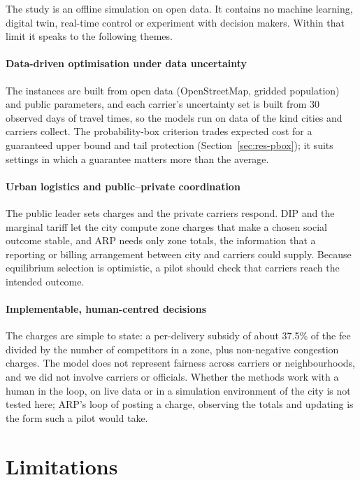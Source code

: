 \documentclass[preprint,12pt]{elsarticle}
\theoremstyle{definition}
\theoremstyle{remark}
\begin{document}
The study is an offline simulation on open data. It contains no machine learning, digital twin, real-time control or experiment with decision makers. Within that limit it speaks to the following themes.

\paragraph{Data-driven optimisation under data uncertainty} The instances are built from open data (OpenStreetMap, gridded population) and public parameters, and each carrier's uncertainty set is built from 30 observed days of travel times, so the models run on data of the kind cities and carriers collect. The probability-box criterion trades expected cost for a guaranteed upper bound and tail protection (Section~\ref{sec:res-pbox}); it suits settings in which a guarantee matters more than the average.

\paragraph{Urban logistics and public--private coordination} The public leader sets charges and the private carriers respond. DIP and the marginal tariff let the city compute zone charges that make a chosen social outcome stable, and ARP needs only zone totals, the information that a reporting or billing arrangement between city and carriers could supply. Because equilibrium selection is optimistic, a pilot should check that carriers reach the intended outcome.

\paragraph{Implementable, human-centred decisions} The charges are simple to state: a per-delivery subsidy of about 37.5\% of the fee divided by the number of competitors in a zone, plus non-negative congestion charges. The model does not represent fairness across carriers or neighbourhoods, and we did not involve carriers or officials. Whether the methods work with a human in the loop, on live data or in a simulation environment of the city is not tested here; ARP's loop of posting a charge, observing the totals and updating is the form such a pilot would take.

\section{Limitations}\label{sec:limits}
\end{document}
